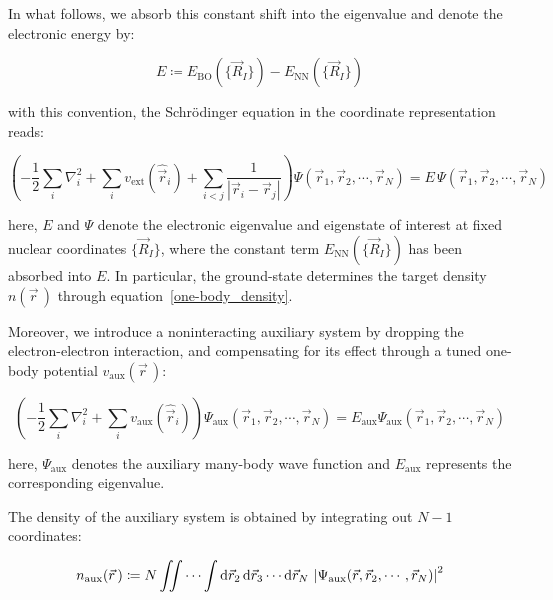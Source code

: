 In what follows, we absorb this constant shift into the eigenvalue and denote the electronic energy by:

\begin{equation}
    E\coloneqq E_\mathrm{BO}(\{\vec{R}_I\})-E_\mathrm{NN}(\{\vec{R}_I\})
\label{absorbed_electronic_energy}
\end{equation}

with this convention, the Schrödinger equation in the coordinate representation reads:

\begin{equation}
    \left(-\frac{1}{2}\sum_i\nabla_i^2
    + \sum_i v_{\mathrm{ext}}(\hat{\vec{r}}_i)
    + \sum_{i<j}\frac{1}{|\vec{r}_i - \vec{r}_j|}\right)\Psi(\vec{r}_1,\vec{r}_2,\cdots,\vec{r}_N)= E\,\Psi(\vec{r}_1,\vec{r}_2,\cdots,\vec{r}_N)
\label{BO_hamiltonian_SE}
\end{equation}

here, $E$ and $\Psi$ denote the electronic eigenvalue and eigenstate of interest at fixed nuclear coordinates $\{\vec{R}_I\}$,
where the constant term $E_\mathrm{NN}(\{\vec{R}_I\})$ has been absorbed into $E$.
In particular, the ground-state determines the target density $n(\vec{r}\,)$ through equation~\eqref{one-body_density}.

Moreover, we introduce a noninteracting auxiliary system by dropping the electron-electron interaction,
and compensating for its effect through a tuned one-body potential $v_\mathrm{aux}(\vec{r}\,)$:

\begin{equation}
    \left(-\frac{1}{2}\sum_i\nabla_i^2
    + \sum_i v_\mathrm{aux}(\hat{\vec{r}}_i)\right)\Psi_\mathrm{aux}(\vec{r}_1,\vec{r}_2,\cdots,\vec{r}_N)= E_\mathrm{aux}\Psi_\mathrm{aux}(\vec{r}_1,\vec{r}_2,\cdots,\vec{r}_N)
\label{BO_hamiltonian_aux}
\end{equation}

here, $\Psi_\mathrm{aux}$ denotes the auxiliary many-body wave function and $E_\mathrm{aux}$ represents the corresponding eigenvalue.

The density of the auxiliary system is obtained by integrating out $N-1$ coordinates:

\begin{equation}
    n_\mathrm{aux}(\vec{r}\,)\coloneqq
    N\iint\cdots\int\mathrm{d}{\vec{r}_2}\,\mathrm{d}{\vec{r}_3}\cdots\mathrm{d}{\vec{r}_N}\,
    \left|\Psi_\mathrm{aux}(\vec{r},\vec{r}_2,\cdots,\vec{r}_N)\right|^2
\label{density_aux}
\end{equation}

